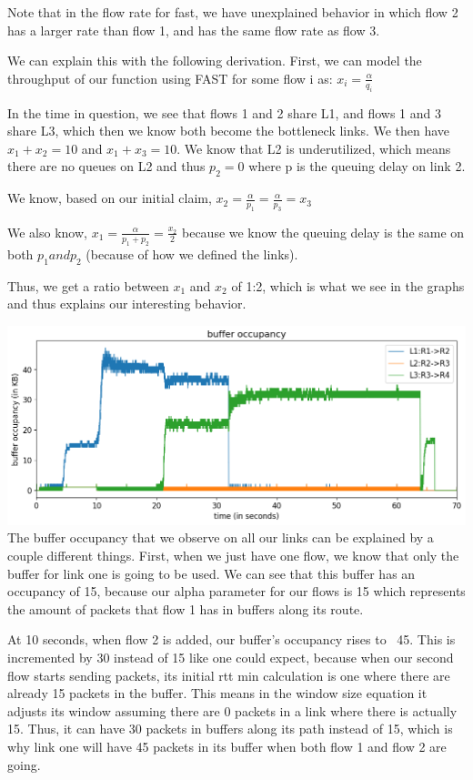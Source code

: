 \documentclass{article}
\begin{document}
Note that in the flow rate for fast, we have unexplained behavior in which flow 2 has a larger rate than flow 1, and has the same flow rate as flow 3. 

We can explain this with the following derivation. First, we can model the throughput of our function using FAST for some flow i as: $ x_i = \frac{\alpha}{q_i} $

In the time in question, we see that flows 1 and 2 share L1, and flows 1 and 3 share L3, which then we know both become the bottleneck links. We then have $x_1 + x_2 = 10 $ and $x_1 + x_3 = 10 $. We know that L2 is underutilized, which means there are no queues on L2 and thus $p_2 = 0 $ where p is the queuing delay on link 2.

We know, based on our initial claim, $ x_2 = \frac{\alpha}{p_1} = \frac{\alpha}{p_3}  = x_3$

We also know, $x_1 = \frac{\alpha}{p_1 + p_2} = \frac{x_2}{ 2}$ because we know the queuing delay is the same on both $p_1 and p_2$ (because of how we defined the links).

Thus, we get a ratio between $x_1$ and $x_2$ of 1:2, which is what we see in the graphs and thus explains our interesting behavior.

\includegraphics[width = \textwidth]{"test_case2_fast buffer occupancy"}
The buffer occupancy that we observe on all our links can be explained by a couple different things. First, when we just have one flow, we know that only the buffer for link one is going to be used. We can see that this buffer has an occupancy of 15, because our alpha parameter for our flows is 15 which represents the amount of packets that flow 1 has in buffers along its route. 

At 10 seconds, when flow 2 is added, our buffer's occupancy rises to ~45. This is incremented by 30 instead of 15 like one could expect, because when our second flow starts sending packets, its initial rtt min calculation is one where there are already 15 packets in the buffer. This means in the window size equation it adjusts its window assuming there are 0 packets in a link where there is actually 15. Thus, it can have 30 packets in buffers along its path instead of 15, which is why link one will have 45 packets in its buffer when both flow 1 and flow 2 are going.
\end{document}
